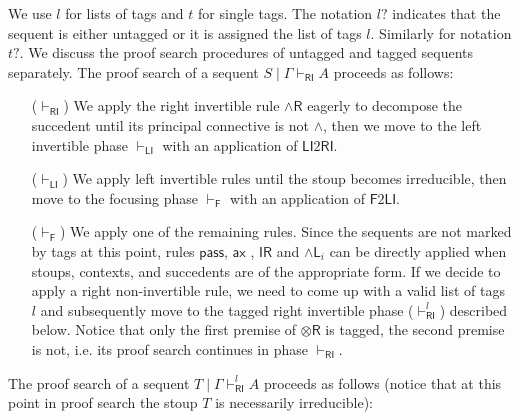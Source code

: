 \documentclass[submission,copyright,creativecommons]{eptcs}
\theoremstyle{definition}
\newcommand{\tr}{\otimes \mathsf{R}}
\newcommand{\pass}{\mathsf{pass}}
\newcommand{\unitr}{\mathsf{IR}}
\newcommand{\andli}{\land \mathsf{L}_{i}}
\newcommand{\andr}{\land \mathsf{R}}
\newcommand{\ax}{\mathsf{ax}}
\newcommand{\RI}{\mathsf{RI}}
\newcommand{\LI}{\mathsf{LI}}
\newcommand{\Pass}{\mathsf{P}}
\newcommand{\F}{\mathsf{F}}
\begin{document}
We use $l$ for lists of tags and $t$ for single tags.
The notation $l?$ indicates that the sequent is either untagged or it is assigned the list of tags $l$. Similarly for notation $t?$.
We discuss the proof search procedures of untagged and tagged sequents separately.
The proof search of a sequent $S \mid \Gamma \vdash_\RI A$ proceeds as follows:
\begin{itemize}
  \item[($\vdash_{\RI}$)] We apply the right invertible rule $\andr$ eagerly to decompose the succedent until its principal connective is not $\land$, then we move to the left invertible phase $\vdash_\LI$ with an application of $\LI 2 \RI$.
  \item[($\vdash_{\LI}$)] We apply left invertible rules until the stoup becomes irreducible, then move to the focusing phase $\vdash_\F$ with an application of $\F 2 \LI$.
  \item[($\vdash_{\F}$)] We apply one of the remaining rules. Since the sequents are not marked by tags at this point, rules $\pass$, $\ax$ , $\unitr$ and $\andli$ can be directly applied when stoups, contexts, and succedents are of the appropriate form.
  If we decide to apply a right non-invertible rule, we need to come up with a valid list of tags $l$ and subsequently move to the tagged right invertible phase ($\vdash^{l}_{\RI}$) described below. Notice that only the first premise of $\tr$ is tagged, the second premise is not, i.e. its proof search continues in phase $\vdash_{\RI}$.
\end{itemize}
The proof search of a sequent $T \mid \Gamma \vdash^{l}_\RI A$ proceeds as follows (notice that at this point in proof search the stoup $T$ is necessarily irreducible):
\end{document}
